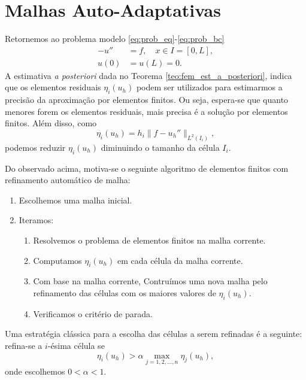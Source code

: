 \section{Malhas Auto-Adaptativas}\label{cap_mef1d_sec_adapt}
\badgeRevisar

Retornemos ao problema modelo \eqref{eq:prob_eq}-\eqref{eq:prob_bc}
\begin{align}
  -u'' &= f,\quad x\in I=[0,L],\\
  u(0) &= u(L) = 0.
\end{align}
A estimativa \textit{a posteriori} dada no Teorema \ref{teo:fem_est_a_posteriori}, indica que os elementos residuais $\eta_i(u_h)$ podem ser utilizados para estimarmos a precisão da aproximação por elementos finitos. Ou seja, espera-se que quanto menores forem os elementos residuais, mais precisa é a solução por elementos finitos. Além disso, como
\begin{equation}
  \eta_i(u_h) = h_i\|f - u_h''\|_{L^2(I_i)},
\end{equation}
podemos reduzir $\eta_i(u_h)$ diminuindo o tamanho da célula $I_i$.

Do observado acima, motiva-se o seguinte algoritmo de elementos finitos com refinamento automático de malha:
\begin{enumerate}
\item Escolhemos uma malha inicial.
\item Iteramos:
  \begin{enumerate}[2.]
  \item Resolvemos o problema de elementos finitos na malha corrente.
  \item Computamos $\eta_i(u_h)$ em cada célula da malha corrente.
  \item Com base na malha corrente, Contruímos uma nova malha pelo refinamento das células com os maiores valores de $\eta_i(u_h)$.
  \item Verificamos o critério de parada.
  \end{enumerate}
\end{enumerate}

Uma estratégia clássica para a escolha das células a serem refinadas é a seguinte: refina-se a $i$-ésima célula se
\begin{equation}\label{eq:ref_estrategia}
  \eta_i(u_h) > \alpha \max_{j=1, 2, \dotsc, n} \eta_j(u_h),
\end{equation}
onde escolhemos $0 < \alpha < 1$.

